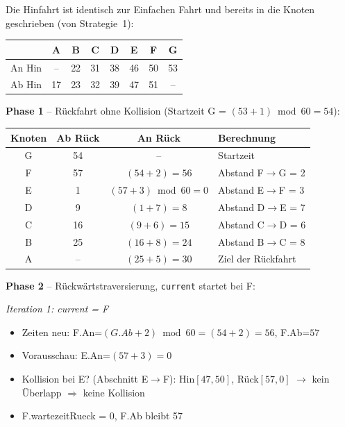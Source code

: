 \documentclass[12pt,a4paper]{article}
\begin{document}
\begin{beispielbox}[title={Einseitiges Warten -- Beispiel2: A--B--C--D--E--F--G, Abstände: 5 8 6 7 3 2, Start: 17}]

Die Hinfahrt ist identisch zur Einfachen Fahrt und bereits in die Knoten geschrieben (von Strategie~1):

\begin{center}
\begin{tabular}{r|ccccccc}
 & A & B & C & D & E & F & G \\
\hline
An Hin & -- & 22 & 31 & 38 & 46 & 50 & 53 \\
Ab Hin & 17 & 23 & 32 & 39 & 47 & 51 & -- \\
\end{tabular}
\end{center}

\textbf{Phase 1} -- Rückfahrt ohne Kollision (Startzeit G = $(53+1)\bmod60 = 54$):

\begin{center}
\begin{tabular}{c|cc|p{7cm}}
\toprule
\textbf{Knoten} & \textbf{Ab Rück} & \textbf{An Rück} & \textbf{Berechnung} \\
\midrule
G & 54 & -- & Startzeit \\
F & 57 & $(54+2)=56$ & Abstand F$\to$G = 2 \\
E & 1 & $(57+3)\bmod60=0$ & Abstand E$\to$F = 3 \\
D & 9 & $(1+7)=8$ & Abstand D$\to$E = 7 \\
C & 16 & $(9+6)=15$ & Abstand C$\to$D = 6 \\
B & 25 & $(16+8)=24$ & Abstand B$\to$C = 8 \\
A & -- & $(25+5)=30$ & Ziel der Rückfahrt \\
\bottomrule
\end{tabular}
\end{center}

\textbf{Phase 2} -- Rückwärtstraversierung, \texttt{current} startet bei F:

\medskip
\textit{Iteration 1: current = F}

\begin{itemize}
    \item Zeiten neu: F.An=$(G.Ab+2)\bmod60=(54+2)=56$, F.Ab=$57$
    \item Vorausschau: E.An=$(57+3)=0$
    \item Kollision bei E? (Abschnitt E$\to$F): Hin$[47,50]$, Rück$[57,0]$ $\to$ kein Überlapp $\Rightarrow$ keine Kollision
    \item F.wartezeitRueck = 0, F.Ab bleibt 57
\end{itemize}


\end{beispielbox}
\end{document}
